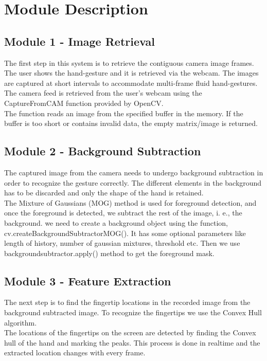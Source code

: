 \documentclass[11pt]{report}
\begin{document}
\section{Module Description}

\subsection{Module 1 - Image Retrieval}
The first step in this system is to retrieve the contiguous camera image frames. The user shows the hand-gesture 
and it is retrieved via the webcam. The images are captured at short intervals to accommodate multi-frame fluid hand-gestures.
\\
The camera feed is retrieved from the user's webcam using the CaptureFromCAM function provided by OpenCV.
\\
The function reads an image from the specified buffer in the memory. If the buffer is too short or contains invalid data, the empty matrix/image is returned.
\subsection{Module 2 - Background Subtraction}
The captured image from the camera needs to undergo background subtraction in order to recognize the gesture correctly. 
The different elements in the background has to be discarded and only the shape of the hand is retained. 
\\
The Mixture of Gaussians (MOG) method is used for foreground detection, and once the foreground is detected, we subtract the rest of the image, i. e., the background.
we need to create a background object using the function, cv.createBackgroundSubtractorMOG(). 
It has some optional parameters like length of history, number of gaussian mixtures, threshold etc. 
Then we use backgroundsubtractor.apply() method to get the foreground mask.
\subsection{Module 3 - Feature Extraction}
The next step is to find the fingertip locations in the recorded image from the background subtracted image.
To recognize the fingertips we use the Convex Hull algorithm. 
\\
The locations of the fingertips on the screen are detected by finding the Convex hull of the 
hand and marking the peaks. This process is done in realtime and the extracted location changes
 with every frame. 
 
\end{document}
